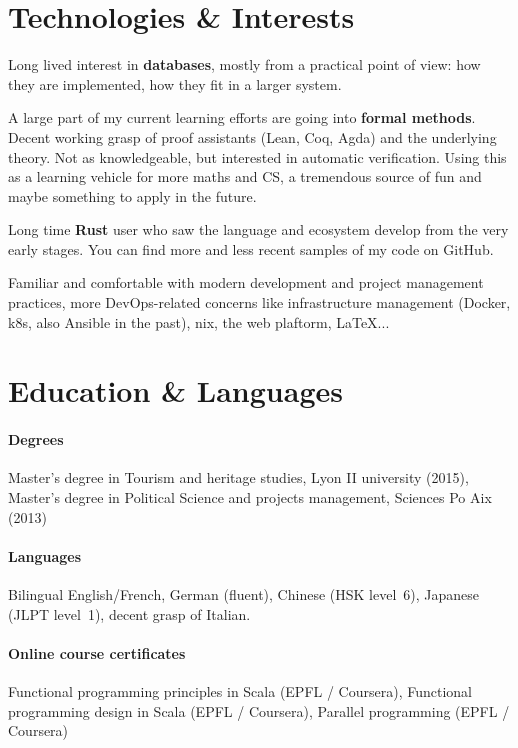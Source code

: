 \documentclass[10pt]{article}
\newcommand{\setparskip}{\setlength{\parskip}{.3em}}
\begin{document}
\begin{minipage}[t]{0.42\textwidth}
  \setparskip
  \section*{Technologies \& Interests}

  Long lived interest in \textbf{databases}, mostly from a practical point of
  view: how they are implemented, how they fit in a larger system.

  A large part of my current learning efforts are going into \textbf{formal
    methods}. Decent working grasp of proof assistants (Lean, Coq, Agda) and the
  underlying theory.  Not as knowledgeable, but interested in automatic
  verification. Using this as a learning vehicle for more maths and CS, a
  tremendous source of fun and maybe something to apply in the future.

  Long time \textbf{Rust} user who saw the language and ecosystem develop
  from the very early stages. You can find more and less recent samples of my
  code on GitHub.

  Familiar and comfortable with modern development and project management
  practices, more DevOps-related concerns like infrastructure management
  (Docker, k8s, also Ansible in the past), nix, the web plaftorm, \LaTeX...

  \section*{Education \& Languages}

  \paragraph{Degrees} Master's degree in Tourism and heritage studies, Lyon II university (2015), Master's degree in Political Science and projects management, Sciences Po Aix (2013)

  \vspace{-1em}

  \paragraph{Languages} Bilingual English/French, German (fluent), Chinese (HSK level~6), Japanese (JLPT level~1), decent grasp of Italian.

  \vspace{-1em}

  \paragraph{Online course certificates} Functional programming principles in Scala (EPFL / Coursera), Functional programming design in Scala (EPFL / Coursera), Parallel programming (EPFL / Coursera)

\end{minipage}
\end{document}
